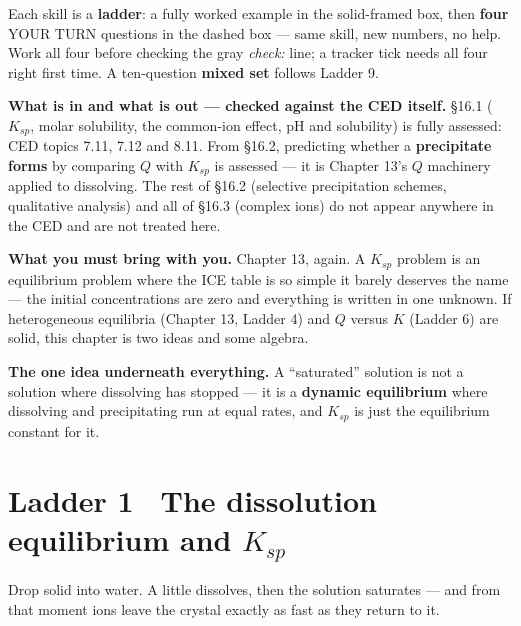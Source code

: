 \documentclass{apchem-worksheet}
\begin{document}
\apctitleblock

\begin{apcnote}
Each skill is a \textbf{ladder}: a fully worked example in the
solid-framed box, then \textbf{four} YOUR TURN questions in the dashed
box --- same skill, new numbers, no help. Work all four before checking
the gray \emph{check:} line; a tracker tick needs all four right first
time. A ten-question \textbf{mixed set} follows Ladder 9.

\textbf{What is in and what is out --- checked against the CED
itself.} \S16.1 ($K_{sp}$, molar solubility, the common-ion effect, pH
and solubility) is fully assessed: CED topics 7.11, 7.12 and 8.11.
From \S16.2, predicting whether a \textbf{precipitate forms} by
comparing $Q$ with $K_{sp}$ is assessed --- it is Chapter 13's $Q$
machinery applied to dissolving. The rest of \S16.2 (selective
precipitation schemes, qualitative analysis) and all of \S16.3
(complex ions) do not appear anywhere in the CED and are not treated
here.

\textbf{What you must bring with you.} Chapter 13, again. A $K_{sp}$
problem is an equilibrium problem where the ICE table is so simple it
barely deserves the name --- the initial concentrations are zero and
everything is written in one unknown. If heterogeneous equilibria
(Chapter 13, Ladder 4) and $Q$ versus $K$ (Ladder 6) are solid, this
chapter is two ideas and some algebra.

\textbf{The one idea underneath everything.} A ``saturated'' solution
is not a solution where dissolving has stopped --- it is a
\textbf{dynamic equilibrium} where dissolving and precipitating run at
equal rates, and $K_{sp}$ is just the equilibrium constant for it.
\end{apcnote}

\section*{\sffamily Ladder 1 \textbullet\ The dissolution equilibrium
and $K_{sp}$}

Drop solid  into water. A little dissolves, then the solution
saturates --- and from that moment ions leave the crystal exactly as
fast as they return to it.
\end{document}
